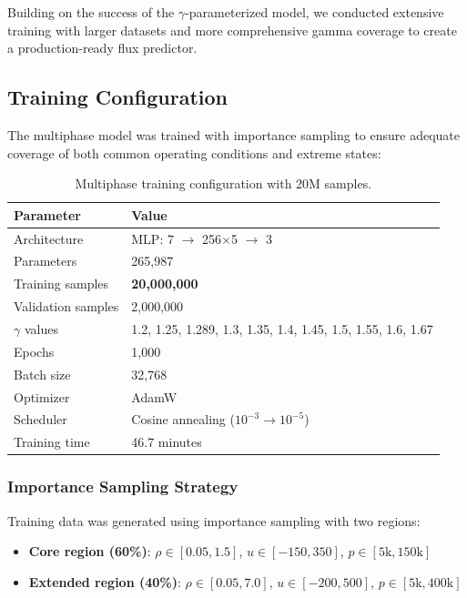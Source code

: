 \documentclass[11pt,a4paper]{article}
\begin{document}
Building on the success of the $\gamma$-parameterized model, we conducted extensive training with larger datasets and more comprehensive gamma coverage to create a production-ready flux predictor.

\subsection{Training Configuration}

The multiphase model was trained with importance sampling to ensure adequate coverage of both common operating conditions and extreme states:

\begin{table}[H]
\centering
\begin{tabular}{ll}
\toprule
Parameter & Value \\
\midrule
Architecture & MLP: 7 $\rightarrow$ 256$\times$5 $\rightarrow$ 3 \\
Parameters & 265,987 \\
Training samples & \textbf{20,000,000} \\
Validation samples & 2,000,000 \\
$\gamma$ values & 1.2, 1.25, 1.289, 1.3, 1.35, 1.4, 1.45, 1.5, 1.55, 1.6, 1.67 \\
Epochs & 1,000 \\
Batch size & 32,768 \\
Optimizer & AdamW \\
Scheduler & Cosine annealing ($10^{-3} \rightarrow 10^{-5}$) \\
Training time & 46.7 minutes \\
\bottomrule
\end{tabular}
\caption{Multiphase training configuration with 20M samples.}
\label{tab:multiphase_config}
\end{table}

\subsubsection{Importance Sampling Strategy}

Training data was generated using importance sampling with two regions:
\begin{itemize}
    \item \textbf{Core region (60\%)}: $\rho \in [0.05, 1.5]$, $u \in [-150, 350]$, $p \in [5\text{k}, 150\text{k}]$
    \item \textbf{Extended region (40\%)}: $\rho \in [0.05, 7.0]$, $u \in [-200, 500]$, $p \in [5\text{k}, 400\text{k}]$
\end{itemize}
\end{document}
